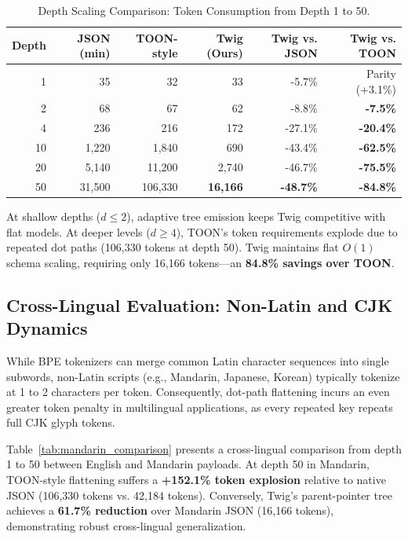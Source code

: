 \documentclass[11pt,a4paper]{article}
\begin{document}
\begin{table}[htbp]
\centering
\small
\caption{Depth Scaling Comparison: Token Consumption from Depth 1 to 50.}
\label{tab:depth_scaling}
\begin{tabular}{rrrrrr}
\toprule
\textbf{Depth} & \textbf{JSON (min)} & \textbf{TOON-style} & \textbf{Twig (Ours)} & \textbf{Twig vs. JSON} & \textbf{Twig vs. TOON} \\
\midrule
1 & 35 & 32 & 33 & -5.7\% & Parity (+3.1\%) \\
2 & 68 & 67 & 62 & -8.8\% & \textbf{-7.5\%} \\
4 & 236 & 216 & 172 & -27.1\% & \textbf{-20.4\%} \\
10 & 1,220 & 1,840 & 690 & -43.4\% & \textbf{-62.5\%} \\
20 & 5,140 & 11,200 & 2,740 & -46.7\% & \textbf{-75.5\%} \\
50 & 31,500 & 106,330 & \textbf{16,166} & \textbf{-48.7\%} & \textbf{-84.8\%} \\
\bottomrule
\end{tabular}
\end{table}

At shallow depths ($d \le 2$), adaptive tree emission keeps Twig competitive with flat models. At deeper levels ($d \ge 4$), TOON's token requirements explode due to repeated dot paths (106,330 tokens at depth 50). Twig maintains flat $O(1)$ schema scaling, requiring only 16,166 tokens—an \textbf{84.8\% savings over TOON}.

\subsection{Cross-Lingual Evaluation: Non-Latin and CJK Dynamics}
While BPE tokenizers can merge common Latin character sequences into single subwords, non-Latin scripts (e.g., Mandarin, Japanese, Korean) typically tokenize at 1 to 2 characters per token. Consequently, dot-path flattening incurs an even greater token penalty in multilingual applications, as every repeated key repeats full CJK glyph tokens.

Table~\ref{tab:mandarin_comparison} presents a cross-lingual comparison from depth 1 to 50 between English and Mandarin payloads. At depth 50 in Mandarin, TOON-style flattening suffers a \textbf{+152.1\% token explosion} relative to native JSON (106,330 tokens vs. 42,184 tokens). Conversely, Twig's parent-pointer tree achieves a \textbf{61.7\% reduction} over Mandarin JSON (16,166 tokens), demonstrating robust cross-lingual generalization.
\end{document}
